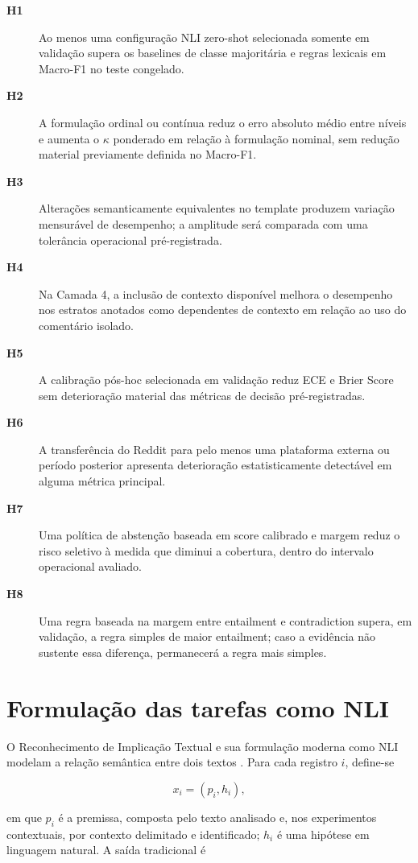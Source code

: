\begin{description}
\item[\textbf{H1}] Ao menos uma configuração NLI zero-shot selecionada somente em validação supera os baselines de classe majoritária e regras lexicais em Macro-F1 no teste congelado.
\item[\textbf{H2}] A formulação ordinal ou contínua reduz o erro absoluto médio entre níveis e aumenta o \(\kappa\) ponderado em relação à formulação nominal, sem redução material previamente definida no Macro-F1.
\item[\textbf{H3}] Alterações semanticamente equivalentes no template produzem variação mensurável de desempenho; a amplitude será comparada com uma tolerância operacional pré-registrada.
\item[\textbf{H4}] Na Camada 4, a inclusão de contexto disponível melhora o desempenho nos estratos anotados como dependentes de contexto em relação ao uso do comentário isolado.
\item[\textbf{H5}] A calibração pós-hoc selecionada em validação reduz ECE e Brier Score sem deterioração material das métricas de decisão pré-registradas.
\item[\textbf{H6}] A transferência do Reddit para pelo menos uma plataforma externa ou período posterior apresenta deterioração estatisticamente detectável em alguma métrica principal.
\item[\textbf{H7}] Uma política de abstenção baseada em score calibrado e margem reduz o risco seletivo à medida que diminui a cobertura, dentro do intervalo operacional avaliado.
\item[\textbf{H8}] Uma regra baseada na margem entre entailment e contradiction supera, em validação, a regra simples de maior entailment; caso a evidência não sustente essa diferença, permanecerá a regra mais simples.
\end{description}

\section{Formulação das tarefas como NLI}
\label{sec:formulacao-nli}

O Reconhecimento de Implicação Textual e sua formulação moderna como NLI modelam a relação semântica entre dois textos \cite{dagan2006,bowman2015}. Para cada registro \(i\), define-se

\[
x_i=(p_i,h_i),
\]

em que \(p_i\) é a premissa, composta pelo texto analisado e, nos experimentos contextuais, por contexto delimitado e identificado; \(h_i\) é uma hipótese em linguagem natural. A saída tradicional é

